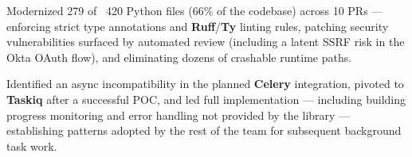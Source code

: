 
\expExtra{} %


\begin{rExperience}

  \item Modernized 279 of ~420 Python files (66\% of the codebase) across 10 PRs --- enforcing strict type annotations
    and \textbf{Ruff}/\textbf{Ty} linting rules, patching security vulnerabilities surfaced by automated review
    (including a latent SSRF risk in the Okta OAuth flow), and eliminating dozens of crashable runtime paths.

  \item Identified an async incompatibility in the planned \textbf{Celery} integration, pivoted to \textbf{Taskiq} after
    a successful POC, and led full implementation --- including building progress monitoring and error handling not
    provided by the library --- establishing patterns adopted by the rest of the team for subsequent background task
    work.

\end{rExperience}
